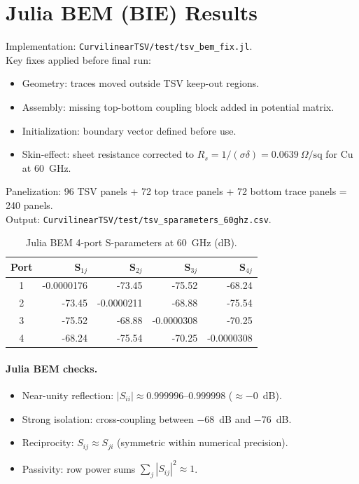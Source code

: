 \documentclass[11pt]{article}
\begin{document}
\section{Julia BEM (BIE) Results}
Implementation: \texttt{CurvilinearTSV/test/tsv\_bem\_fix.jl}.\\
Key fixes applied before final run:
\begin{itemize}
  \item Geometry: traces moved outside TSV keep-out regions.
  \item Assembly: missing top-bottom coupling block added in potential matrix.
  \item Initialization: boundary vector defined before use.
  \item Skin-effect: sheet resistance corrected to $R_s = 1/(\sigma\delta)=0.0639~\Omega/\mathrm{sq}$ for Cu at 60~GHz.
\end{itemize}

Panelization: 96 TSV panels + 72 top trace panels + 72 bottom trace panels = 240 panels.\\
Output: \texttt{CurvilinearTSV/test/tsv\_sparameters\_60ghz.csv}.

\begin{table}[h]
\centering
\caption{Julia BEM 4-port S-parameters at 60~GHz (dB).}
\label{tab:julia-s}
\begin{tabular}{crrrr}
\toprule
Port & S$_{1j}$ & S$_{2j}$ & S$_{3j}$ & S$_{4j}$ \\
\midrule
1 & -0.0000176 & -73.45 & -75.52 & -68.24 \\
2 & -73.45     & -0.0000211 & -68.88 & -75.54 \\
3 & -75.52     & -68.88 & -0.0000308 & -70.25 \\
4 & -68.24     & -75.54 & -70.25 & -0.0000308 \\
\bottomrule
\end{tabular}
\end{table}

\paragraph{Julia BEM checks.}
\begin{itemize}
  \item Near-unity reflection: $|S_{ii}| \approx 0.999996$--$0.999998$ ($\approx -0$~dB).
  \item Strong isolation: cross-coupling between \SI{-68}{dB} and \SI{-76}{dB}.
  \item Reciprocity: $S_{ij}\approx S_{ji}$ (symmetric within numerical precision).
  \item Passivity: row power sums $\sum_j |S_{ij}|^2 \approx 1$.
\end{itemize}
\end{document}

